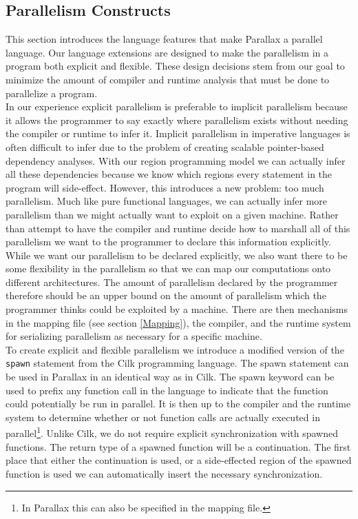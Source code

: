 \documentclass{article}
\theoremstyle{definition}
\begin{document}
\subsection{Parallelism Constructs \label{Parallelism}}
\noindent
This section introduces the language features that make Parallax a parallel
language.  Our language extensions are designed to make the parallelism
in a program both explicit and flexible.  These design decisions stem
from our goal to minimize the amount of compiler and runtime analysis
that must be done to parallelize a program. \\

\noindent
In our experience explicit parallelism is preferable to implicit parallelism
because it allows the programmer to say exactly where parallelism exists
without needing the compiler or runtime to infer it.  Implicit parallelism in
imperative languages is often difficult to infer due to the problem of creating
scalable pointer-based dependency analyses.  With our region programming model
we can actually infer all these dependencies because we know which regions every
statement in the program will side-effect.  However, this introduces a new 
problem: too much parallelism.  Much like pure functional languages, we can actually
infer more parallelism than we might actually want to exploit on a given machine.
Rather than attempt to have the compiler and runtime decide how to marshall all of
this parallelism we want to the programmer to declare this information explicitly.\\

\noindent
While we want our parallelism to be declared explicitly, we also want there
to be some flexibility in the parallelism so that we can map our computations onto
different architectures.  The amount of parallelism declared by the programmer
therefore should be an upper bound on the amount of parallelism which the programmer
thinks could be exploited by a machine.  There are then mechanisms in the mapping
file (see section \ref{Mapping}), the compiler, and the runtime system for serializing
parallelism as necessary for a specific machine. \\

\noindent
To create explicit and flexible parallelism we introduce a modified version of the
{\tt spawn} statement from the Cilk programming language\cite{Blumofe95}.  The
spawn statement can be used in Parallax in an identical way as in Cilk.  The spawn
keyword can be used to prefix any function call in the language to indicate that
the function could potentially be run in parallel.  It is then up to the compiler and
the runtime system to determine whether or not function calls are actually executed
in parallel\footnote{In Parallax this can also be specified in the mapping file.}.
Unlike Cilk, we do not require explicit synchronization with spawned functions.  The
return type of a spawned function will be a continuation.  The first place that either
the continuation is used, or a side-effected region of the spawned function is used
we can automatically insert the necessary synchronization. \\
\end{document}
